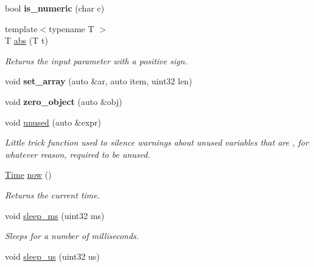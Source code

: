 \begin{DoxyCompactItemize}
\item 
\hypertarget{namespaceetk_a6915371a9b13694ed6a71f03cb929ce2}{bool {\bfseries is\-\_\-numeric} (char c)}\label{namespaceetk_a6915371a9b13694ed6a71f03cb929ce2}

\item 
\hypertarget{namespaceetk_af4854b73ae0591651e39ab85b52fc454}{{\footnotesize template$<$typename T $>$ }\\T \hyperlink{namespaceetk_af4854b73ae0591651e39ab85b52fc454}{abs} (T t)}\label{namespaceetk_af4854b73ae0591651e39ab85b52fc454}

\begin{DoxyCompactList}\small\item\em Returns the input parameter with a positive sign. \end{DoxyCompactList}\item 
\hypertarget{namespaceetk_ab8516b85204e74836dce3912f84b5c99}{void {\bfseries set\-\_\-array} (auto \&ar, auto item, uint32 len)}\label{namespaceetk_ab8516b85204e74836dce3912f84b5c99}

\item 
\hypertarget{namespaceetk_a75727099fdbe4ad245ec9309c2909c82}{void {\bfseries zero\-\_\-object} (auto \&obj)}\label{namespaceetk_a75727099fdbe4ad245ec9309c2909c82}

\item 
\hypertarget{namespaceetk_a056214e88dcad64089b2038ac534ab7d}{void \hyperlink{namespaceetk_a056214e88dcad64089b2038ac534ab7d}{unused} (auto \&expr)}\label{namespaceetk_a056214e88dcad64089b2038ac534ab7d}

\begin{DoxyCompactList}\small\item\em Little trick function used to silence warnings about unused variables that are , for whatever reason, required to be unused. \end{DoxyCompactList}\item 
\hypertarget{namespaceetk_a7a4a7ecbe90351343cacfe5838433436}{\hyperlink{classetk_1_1_time}{Time} \hyperlink{namespaceetk_a7a4a7ecbe90351343cacfe5838433436}{now} ()}\label{namespaceetk_a7a4a7ecbe90351343cacfe5838433436}

\begin{DoxyCompactList}\small\item\em Returns the current time. \end{DoxyCompactList}\item 
void \hyperlink{namespaceetk_a79ddc21fd043dd193576bef72c352057}{sleep\-\_\-ms} (uint32 ms)
\begin{DoxyCompactList}\small\item\em Sleeps for a number of milliseconds. \end{DoxyCompactList}\item 
\hypertarget{namespaceetk_a7ed2926aac480d0b7f9b94f19e19afaa}{void \hyperlink{namespaceetk_a7ed2926aac480d0b7f9b94f19e19afaa}{sleep\-\_\-us} (uint32 us)}\label{namespaceetk_a7ed2926aac480d0b7f9b94f19e19afaa}


\end{DoxyCompactItemize}
